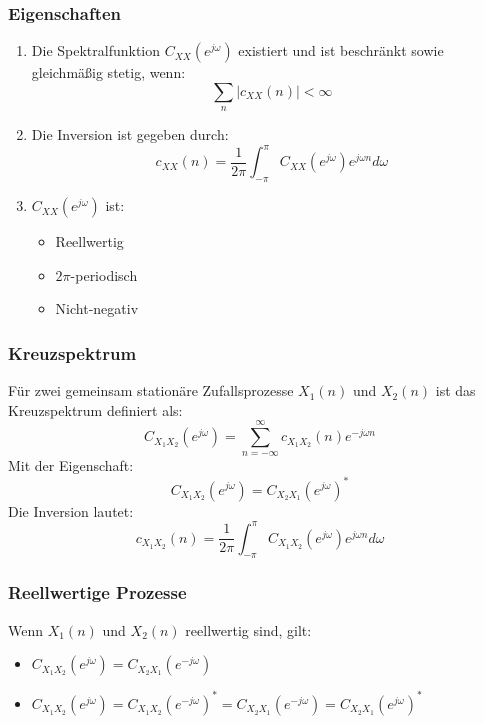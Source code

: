 \documentclass[12pt]{article}
\begin{document}
   \subsubsection{Eigenschaften}
      \begin{enumerate}
      \item Die Spektralfunktion \(C_{XX}(e^{j\omega})\) existiert und ist beschränkt sowie gleichmäßig stetig, wenn:
      \[
         \sum_{n} |c_{XX}(n)| < \infty
      \]
         \item Die Inversion ist gegeben durch:
      \[
         c_{XX}(n) = \frac{1}{2\pi} \int_{-\pi}^{\pi} C_{XX}(e^{j\omega}) e^{j\omega n} d\omega
      \]
      \item \(C_{XX}(e^{j\omega})\) ist:
      \begin{itemize}
         \item Reellwertig
         \item \(2\pi\)-periodisch
         \item Nicht-negativ
      \end{itemize}
      \end{enumerate}

   \subsubsection{Kreuzspektrum}
      Für zwei gemeinsam stationäre Zufallsprozesse \(X_1(n)\) und \(X_2(n)\) ist das Kreuzspektrum definiert als:
      \[
         C_{X_1X_2}(e^{j\omega}) = \sum_{n=-\infty}^\infty c_{X_1X_2}(n) e^{-j\omega n}
      \]
      Mit der Eigenschaft:
      \[
         C_{X_1X_2}(e^{j\omega}) = C_{X_2X_1}(e^{j\omega})^*   %
      \]
      Die Inversion lautet:
      \[
         c_{X_1X_2}(n) = \frac{1}{2\pi} \int_{-\pi}^{\pi} C_{X_1X_2}(e^{j\omega}) e^{j\omega n} d\omega
      \]

   \subsubsection{Reellwertige Prozesse}
      Wenn \(X_1(n)\) und \(X_2(n)\) reellwertig sind, gilt:
      \begin{itemize}
         \item \(C_{X_1X_2}(e^{j\omega}) = C_{X_2X_1}(e^{-j\omega})\)
         \item \(C_{X_1X_2}(e^{j\omega}) = C_{X_1X_2}(e^{-j\omega})^* = C_{X_2X_1}(e^{-j\omega}) = C_{X_2X_1}(e^{j\omega})^*\)  %
      \end{itemize}
\end{document}
